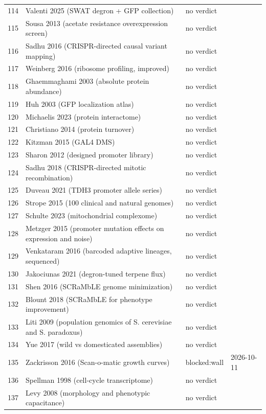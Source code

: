 \begin{longtable}{@{}r L{88mm} L{40mm} L{24mm}@{}}
114 & Valenti 2025 (SWAT degron + GFP collection) & no verdict &  \\
115 & Sousa 2013 (acetate resistance overexpression screen) & no verdict &  \\
116 & Sadhu 2016 (CRISPR-directed causal variant mapping) & no verdict &  \\
117 & Weinberg 2016 (ribosome profiling, improved) & no verdict &  \\
118 & Ghaemmaghami 2003 (absolute protein abundance) & no verdict &  \\
119 & Huh 2003 (GFP localization atlas) & no verdict &  \\
120 & Michaelis 2023 (protein interactome) & no verdict &  \\
121 & Christiano 2014 (protein turnover) & no verdict &  \\
122 & Kitzman 2015 (GAL4 DMS) & no verdict &  \\
123 & Sharon 2012 (designed promoter library) & no verdict &  \\
124 & Sadhu 2018 (CRISPR-directed mitotic recombination) & no verdict &  \\
125 & Duveau 2021 (TDH3 promoter allele series) & no verdict &  \\
126 & Strope 2015 (100 clinical and natural genomes) & no verdict &  \\
127 & Schulte 2023 (mitochondrial complexome) & no verdict &  \\
128 & Metzger 2015 (promoter mutation effects on expression and noise) & no verdict &  \\
129 & Venkataram 2016 (barcoded adaptive lineages, sequenced) & no verdict &  \\
130 & Jakociunas 2021 (degron-tuned terpene flux) & no verdict &  \\
131 & Shen 2016 (SCRaMbLE genome minimization) & no verdict &  \\
132 & Blount 2018 (SCRaMbLE for phenotype improvement) & no verdict &  \\
133 & Liti 2009 (population genomics of S. cerevisiae and S. paradoxus) & no verdict &  \\
134 & Yue 2017 (wild vs domesticated assemblies) & no verdict &  \\
135 & Zackrisson 2016 (Scan-o-matic growth curves) & blocked:wall & 2026-10-11 \\
136 & Spellman 1998 (cell-cycle transcriptome) & no verdict &  \\
137 & Levy 2008 (morphology and phenotypic capacitance) & no verdict &  \\

\end{longtable}
